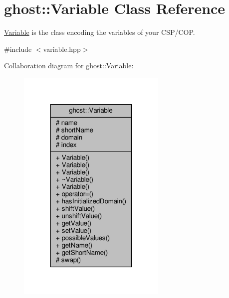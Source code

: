 \hypertarget{classghost_1_1Variable}{}\section{ghost\+:\+:Variable Class Reference}
\label{classghost_1_1Variable}


\hyperlink{classghost_1_1Variable}{Variable} is the class encoding the variables of your C\+S\+P/\+C\+OP.  




{\ttfamily \#include $<$variable.\+hpp$>$}



Collaboration diagram for ghost\+:\+:Variable\+:
\nopagebreak
\begin{figure}[H]
\begin{center}
\leavevmode
\includegraphics[width=202pt]{classghost_1_1Variable__coll__graph}
\end{center}
\end{figure}
